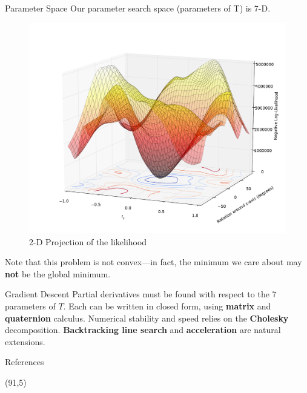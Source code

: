\documentclass[final]{beamer}
\begin{document}
\begin{frame}{}
\begin{textblock}{27}
\begin{block}{Parameter Space}
Our parameter search space (parameters of T) is 7-D.
\begin{figure}
\includegraphics[width=10in]{LLmap3.pdf}
\caption{2-D Projection of the likelihood}
\end{figure}
Note that this problem is not convex---in fact, the minimum we care about may {\bf not} be the global minimum. 
\end{block}

\begin{block}{Gradient Descent}
Partial derivatives must be found with respect to the 7 parameters of $T$. Each can be written in closed form,
using {\bf matrix} and {\bf quaternion} calculus. Numerical stability and speed relies on the {\bf Cholesky} decomposition. {\bf Backtracking line search} and {\bf acceleration} are natural extensions.
\end{block}


\begin{block}{References}
{
\footnotesize


}
\end{block}


\end{textblock}
\begin{textblock}{27}(91,5)


\end{textblock}
\end{frame}
\end{document}
